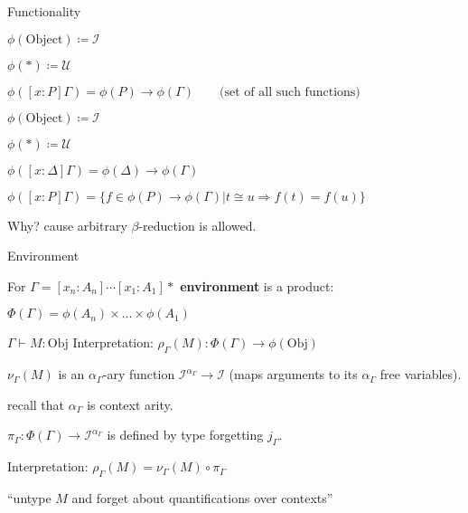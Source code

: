 \documentclass{beamer}
\begin{document}
\begin{frame}{Functionality}
\begin{definition}
$\phi(\mbox{Object}) \coloneqq  \mathscr{I} $

$\phi(*) \coloneqq \mathscr{U}$

$\phi([x:P]\Gamma) = \phi(P) \rightarrow \phi(\Gamma) \quad\quad \mbox{(set of all such functions)}$

\end{definition}


\begin{definition}
$\phi(\mbox{Object}) \coloneqq  \mathscr{I} $

$\phi(*) \coloneqq \mathscr{U}$

$\phi([x:\Delta]\Gamma) = \phi(\Delta) \rightarrow \phi(\Gamma)$

$\phi([x:P]\Gamma) = \{ f \in \phi(P) \rightarrow \phi(\Gamma)  | t \cong u \Rightarrow f(t) = f(u) \}$


Why? cause arbitrary $\beta$-reduction is allowed.

\end{definition}
\end{frame}

\begin{frame}{Environment}
\begin{definition} 
For $\Gamma = [x_n: A_n] \cdots [x_1: A_1]*$ \textbf{environment} is a product:

$\Phi(\Gamma) = \phi(A_n) \times \dots \times \phi(A_1)$
\end{definition}

\end{frame}

\begin{frame}{$\Gamma \vdash M : \text{Obj}$}
Interpretation: $\rho_{\Gamma}(M): \Phi(\Gamma) \rightarrow\phi(\text{Obj})$


$\nu_{\Gamma}(M)$ is an $\alpha_{\Gamma}$-ary function $\mathscr{I} ^{\alpha_{\Gamma}} \rightarrow \mathscr{I}$ (maps arguments to its $\alpha_{\Gamma}$ free variables).

recall that $\alpha_{\Gamma}$ is context arity. 



$\pi_{\Gamma} : \Phi(\Gamma) \rightarrow \mathscr{I}^{\alpha_{\Gamma}}$ is defined by type forgetting $j_{\Gamma}.$

Interpretation: $\rho_{\Gamma}(M) = \nu_{\Gamma}(M) \circ \pi_{\Gamma}$

``untype $M$ and forget about quantifications over contexts''
\end{frame}
\end{document}
